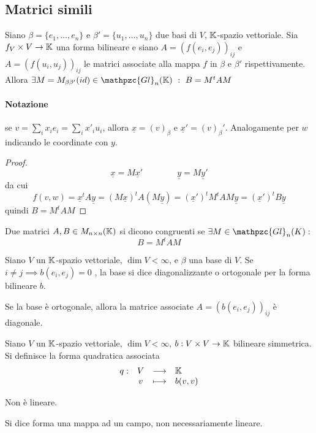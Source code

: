 \documentclass{article}     %
\let\undl\underline
\newcommand{\gln}[2]{\mathpzc{Gl}_{#1}(#2)}
\begin{document}
\subsection{Matrici simili}
\begin{lemma}
    Siano $\beta=\{e_1, \dots, e_n\}$ e $\beta'=\{u_1, \dots, u_n\}$ due basi di $V$, $\mathbb{K}$-spazio vettoriale. Sia $f_V\times V\to \mathbb{K}$ una forma bilineare e siano $A=(f(e_i,e_j))_{ij}$ e $A=(f(u_i,u_j))_{ij}$ le matrici associate alla mappa $f$ in $\beta $ e $\beta'$ rispettivamente. Allora $\exists M=M_{\beta\beta'}(id)\in \gln{n}{\K}\ :\ B=M^t AM$
\end{lemma}
\paragraph{Notazione} se $v= \sum_ix_ie_i= \sum _ix'_iu_i$, allora $\underline x = (v)_\beta$ e $\underline x' = (v)_\beta'$. Analogamente per $w$ indicando le coordinate con $y$.
\begin{proof}
    \[\underline{x} = M\undl x'\qquad \qquad \undl y = M \undl y'\]
    da cui 
    \[f(v,w)= \undl x^tA \undl y = (M\undl x)^t A (M\undl y) = ( \undl x')^tM^tAM\undl y = ( \undl x')^t B \undl y\]
    quindi $B=M^tAM$
\end{proof}
\begin{boxdef}
    Due matrici $A,B\in M_{n\times n}(\mathbb{K})$ si dicono congruenti se $\exists M \in \gln{n}{K}:$
    \[B=M^tAM\]
\end{boxdef}

\begin{boxdef}
    Siano $V$ un $\mathbb{K}$-spazio vettoriale, $\dim V<\infty$, e $\beta$ una base di $V$. Se $i\neq j\implies b(e_i,e_j)=0$ , la base si dice diagonalizzante o ortogonale per la forma bilineare $b$. 
\end{boxdef}
\begin{oss}
    Se la base è ortogonale, allora la matrice associate $A=(b(e_i,e_j))_{ij}$ è diagonale.
\end{oss}

\begin{boxdef}
    Siano $V$ un $\mathbb{K}$-spazio vettoriale, $\dim V<\infty$, $b: V\times V \to \mathbb{K}$ bilineare simmetrica. Si definisce la forma quadratica associata
    \[\begin{array}{cccl} q : & V & \longrightarrow & \mathbb{K} \\ & v & \longmapsto & b(v,v) \end{array}\]
\end{boxdef}
\begin{oss}
    Non è lineare.
\end{oss}
\begin{ricorda}
    Si dice forma una mappa ad un campo, non necessariamente lineare. 
\end{ricorda}
\end{document}
